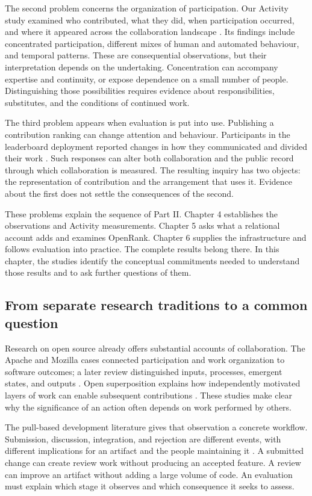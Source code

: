 The second problem concerns the organization of participation. Our Activity study examined who contributed, what they did, when participation occurred, and where it appeared across the collaboration landscape \citep{xia2022}. Its findings include concentrated participation, different mixes of human and automated behaviour, and temporal patterns. These are consequential observations, but their interpretation depends on the undertaking. Concentration can accompany expertise and continuity, or expose dependence on a small number of people. Distinguishing those possibilities requires evidence about responsibilities, substitutes, and the conditions of continued work.

The third problem appears when evaluation is put into use. Publishing a contribution ranking can change attention and behaviour. Participants in the leaderboard deployment reported changes in how they communicated and divided their work \citep[Section 4.2]{zhao2024}. Such responses can alter both collaboration and the public record through which collaboration is measured. The resulting inquiry has two objects: the representation of contribution and the arrangement that uses it. Evidence about the first does not settle the consequences of the second.

These problems explain the sequence of Part II. Chapter 4 establishes the observations and Activity measurements. Chapter 5 asks what a relational account adds and examines OpenRank. Chapter 6 supplies the infrastructure and follows evaluation into practice. The complete results belong there. In this chapter, the studies identify the conceptual commitments needed to understand those results and to ask further questions of them.

\subsection{From separate research traditions to a common question}
Research on open source already offers substantial accounts of collaboration. The Apache and Mozilla cases connected participation and work organization to software outcomes; a later review distinguished inputs, processes, emergent states, and outputs \citep{mockus2002,crowston2012}. Open superposition explains how independently motivated layers of work can enable subsequent contributions \citep{howison2014}. These studies make clear why the significance of an action often depends on work performed by others.

The pull-based development literature gives that observation a concrete workflow. Submission, discussion, integration, and rejection are different events, with different implications for an artifact and the people maintaining it \citep{gousios2014}. A submitted change can create review work without producing an accepted feature. A review can improve an artifact without adding a large volume of code. An evaluation must explain which stage it observes and which consequence it seeks to assess.

